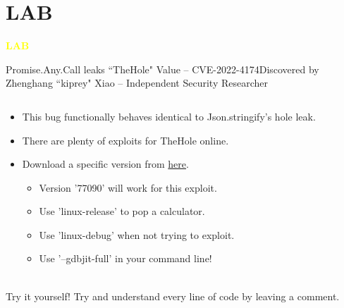 \section{LAB}
\begin{frame}{}
    \centering
        \Huge\bfseries
    \textcolor{yellow}{LAB}
\end{frame}

\begin{frame}{Promise.Any.Call leaks ``TheHole" Value -- CVE-2022-4174}{Discovered by Zhenghang ``kiprey" Xiao -- Independent Security Researcher}
    \begin{columns}
        \begin{column}{0.55\textwidth}
            \begin{itemize}
                \item This bug functionally behaves identical to Json.stringify's hole leak.
                \item There are plenty of exploits for TheHole online. 
                \item Download a specific version from \href{https://commondatastorage.googleapis.com/v8-asan/index.html}{\color{pink}here}.
                    \begin{itemize}
                        \item Version '77090' will work for this exploit.
                        \item Use 'linux-release' to pop a calculator.
                        \item Use 'linux-debug' when not trying to exploit.
                        \item Use '--gdbjit-full' in your command line! 
                    \end{itemize}
            \end{itemize}
        \href{https://bugs.chromium.org/p/chromium/issues/detail?id=1379054}{\color{pink}{crbug-1379054}} \\
        Try it yourself! Try and understand every line of code by leaving a comment. 
        \end{column}
        \begin{column}{0.4\textwidth}
            \inputminted{js}{code/promise.tex}
        \end{column}
    \end{columns}
\end{frame}
